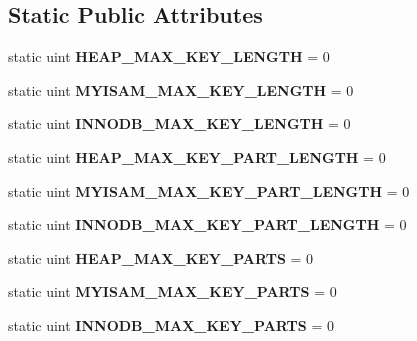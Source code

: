 \subsection*{Static Public Attributes}
\begin{DoxyCompactItemize}
\item 
\mbox{\label{classCache__temp__engine__properties_a1dfea3b8e4d84f2597301ae2c990de8d}} 
static uint {\bfseries H\+E\+A\+P\+\_\+\+M\+A\+X\+\_\+\+K\+E\+Y\+\_\+\+L\+E\+N\+G\+TH} = 0
\item 
\mbox{\label{classCache__temp__engine__properties_a87ec66633a9f30a753d33ae3ab348b5b}} 
static uint {\bfseries M\+Y\+I\+S\+A\+M\+\_\+\+M\+A\+X\+\_\+\+K\+E\+Y\+\_\+\+L\+E\+N\+G\+TH} = 0
\item 
\mbox{\label{classCache__temp__engine__properties_a55982d510cc1c5b7a3f9bdbe3fa890b8}} 
static uint {\bfseries I\+N\+N\+O\+D\+B\+\_\+\+M\+A\+X\+\_\+\+K\+E\+Y\+\_\+\+L\+E\+N\+G\+TH} = 0
\item 
\mbox{\label{classCache__temp__engine__properties_a3c6581ceefe0345ad311c1d25da6e39d}} 
static uint {\bfseries H\+E\+A\+P\+\_\+\+M\+A\+X\+\_\+\+K\+E\+Y\+\_\+\+P\+A\+R\+T\+\_\+\+L\+E\+N\+G\+TH} = 0
\item 
\mbox{\label{classCache__temp__engine__properties_a56f6c38c8740516c917ea95825163efb}} 
static uint {\bfseries M\+Y\+I\+S\+A\+M\+\_\+\+M\+A\+X\+\_\+\+K\+E\+Y\+\_\+\+P\+A\+R\+T\+\_\+\+L\+E\+N\+G\+TH} = 0
\item 
\mbox{\label{classCache__temp__engine__properties_a3d643980cf148ea8b14b7fe8e74c1a2c}} 
static uint {\bfseries I\+N\+N\+O\+D\+B\+\_\+\+M\+A\+X\+\_\+\+K\+E\+Y\+\_\+\+P\+A\+R\+T\+\_\+\+L\+E\+N\+G\+TH} = 0
\item 
\mbox{\label{classCache__temp__engine__properties_a0c53ca269d84035ac4160cc999443c60}} 
static uint {\bfseries H\+E\+A\+P\+\_\+\+M\+A\+X\+\_\+\+K\+E\+Y\+\_\+\+P\+A\+R\+TS} = 0
\item 
\mbox{\label{classCache__temp__engine__properties_ab6aa200c96a6c9258709b489a585a817}} 
static uint {\bfseries M\+Y\+I\+S\+A\+M\+\_\+\+M\+A\+X\+\_\+\+K\+E\+Y\+\_\+\+P\+A\+R\+TS} = 0
\item 
\mbox{\label{classCache__temp__engine__properties_a188b354b23ee034a266105cc515cb2eb}} 
static uint {\bfseries I\+N\+N\+O\+D\+B\+\_\+\+M\+A\+X\+\_\+\+K\+E\+Y\+\_\+\+P\+A\+R\+TS} = 0
\end{DoxyCompactItemize}


